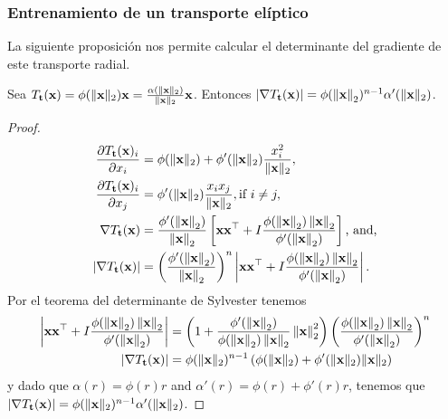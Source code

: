 \subsubsection{Entrenamiento de un transporte elíptico}

La siguiente proposición nos permite calcular el determinante del gradiente de este transporte radial.
\begin{proposition}
	Sea \(T_{\mathbf{t}}(\mathbf{x})= \phi(\lVert \mathbf{x} \rVert_2)\mathbf{x} = \frac{\alpha(\lVert \mathbf{x} \rVert_2)}{\lVert \mathbf{x} \rVert_2}\mathbf{x}\). Entonces \(|\nabla T_{\mathbf{t}}(\mathbf{x})| = \phi(\left\Vert \mathbf{x} \right\Vert_{2})^{n-1}\alpha'(\lVert \mathbf{x} \rVert_2)\). 
	\begin{proof}
		\begin{align*}
		\frac{\partial T_{\mathbf{t}}(\mathbf{x})_i}{\partial x_i} &= \phi(\lVert \mathbf{x} \rVert_2) + \phi'(\lVert \mathbf{x} \rVert_2)\frac{x_i^2}{\lVert \mathbf{x} \rVert_2},\\
		\frac{\partial T_{\mathbf{t}}(\mathbf{x})_i}{\partial x_j} &= \phi'(\lVert \mathbf{x} \rVert_2)\frac{x_i x_j}{\lVert \mathbf{x} \rVert_2}, \text{if } i\neq j,\\
		\nabla T_{\mathbf{t}}(\mathbf{x}) &= \frac{\phi'(\left\Vert \mathbf{x} \right\Vert_{2})}{\left\Vert \mathbf{x} \right\Vert_{2}} \left[ \mathbf{x}\mathbf{x}^{\top} + I \frac{\phi(\left\Vert \mathbf{x} \right\Vert_{2})\left\Vert \mathbf{x} \right\Vert_{2}}{\phi'(\left\Vert \mathbf{x} \right\Vert_{2})}\right] \text{, and,}\\
		\left\vert \nabla T_{\mathbf{t}}(\mathbf{x}) \right\vert  &= \left(\frac{\phi'(\left\Vert \mathbf{x} \right\Vert_{2})}{\left\Vert \mathbf{x} \right\Vert_{2}}\right)^n\left\vert \mathbf{x}\mathbf{x}^{\top} + I \frac{\phi(\left\Vert \mathbf{x} \right\Vert_{2})\left\Vert \mathbf{x} \right\Vert_{2}}{\phi'(\left\Vert \mathbf{x} \right\Vert_{2})}\right\vert.
		\end{align*}
		Por el teorema del determinante de Sylvester tenemos
		\begin{align*}
		\left\vert \mathbf{x}\mathbf{x}^{\top} + I \frac{\phi(\left\Vert \mathbf{x} \right\Vert_{2})\left\Vert \mathbf{x} \right\Vert_{2}}{\phi'(\left\Vert \mathbf{x} \right\Vert_{2})} \right\vert &= \left(1 + \frac{\phi'(\left\Vert \mathbf{x} \right\Vert_{2})}{\phi(\left\Vert \mathbf{x} \right\Vert_{2})\left\Vert \mathbf{x} \right\Vert_{2}}\left\Vert \mathbf{x} \right\Vert_{2}^2 \right) \left(\frac{\phi(\left\Vert \mathbf{x} \right\Vert_{2})\left\Vert \mathbf{x} \right\Vert_{2}}{\phi'(\left\Vert \mathbf{x} \right\Vert_{2})}\right)^n\\
		\left\vert \nabla T_{\mathbf{t}}(\mathbf{x}) \right\vert &= \phi(\lVert \mathbf{x} \rVert_2)^{n-1} \left(\phi(\lVert \mathbf{x} \rVert_2) + \phi'(\lVert \mathbf{x} \rVert_2)\lVert \mathbf{x} \rVert_2 \right)
		\end{align*}
		y dado que \(\alpha(r) = \phi(r)r\) and \(\alpha'(r) = \phi(r) + \phi'(r)r\), tenemos que \(\left\vert \nabla T_{\mathbf{t}}(\mathbf{x}) \right\vert = \phi(\lVert \mathbf{x} \rVert_2)^{n-1}\alpha'(\lVert \mathbf{x} \rVert_2)\).
	\end{proof}
\end{proposition}

